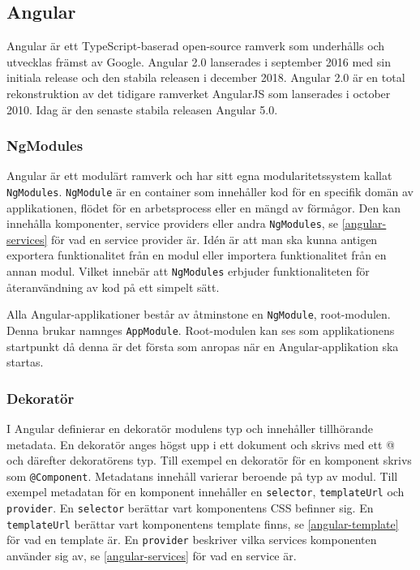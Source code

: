 
\subsection{Angular}
Angular är ett TypeScript-baserad open-source ramverk som underhålls och utvecklas främst av Google. Angular 2.0 lanserades i september 2016 med sin initiala release och den stabila releasen i december 2018. Angular 2.0 är en total rekonstruktion av det tidigare ramverket AngularJS som lanserades i october 2010. Idag är den senaste stabila releasen Angular 5.0. \cite{angular-date}

\subsubsection{NgModules}
Angular är ett modulärt ramverk och har sitt egna modularitetssystem kallat \texttt{NgModules}.\cite{angular-architecture} \texttt{NgModule} är en container som innehåller kod för en specifik domän av applikationen, flödet för en arbetsprocess eller en mängd av förmågor. Den kan innehålla komponenter, service providers eller andra \texttt{NgModules}, se \ref{angular-services} för vad en service provider är. Idén är att man ska kunna antigen exportera funktionalitet från en modul eller importera funktionalitet från en annan modul. Vilket innebär att \texttt{NgModules} erbjuder funktionaliteten för återanvändning av kod på ett simpelt sätt. 

Alla Angular-applikationer består av åtminstone en \texttt{NgModule}, root-modulen. Denna brukar namnges \texttt{AppModule}.\cite{angular-modules} Root-modulen kan ses som applikationens startpunkt då denna är det första som anropas när en Angular-applikation ska startas.



\subsubsection{Dekoratör}
I Angular definierar en dekoratör modulens typ och innehåller tillhörande metadata. En dekoratör anges högst upp i ett dokument och skrivs med ett @ och därefter dekoratörens typ. Till exempel en dekoratör för en komponent skrivs som \texttt{@Component}.\cite{angular-modules} Metadatans innehåll varierar beroende på typ av modul. Till exempel metadatan för en komponent innehåller en \texttt{selector}, \texttt{templateUrl} och \texttt{provider}. En \texttt{selector} berättar vart komponentens CSS befinner sig. En \texttt{templateUrl} berättar vart komponentens template finns, se \ref{angular-template} för vad en template är. En \texttt{provider} beskriver vilka services komponenten använder sig av, se \ref{angular-services} för vad en service är. \cite{angular-components}

